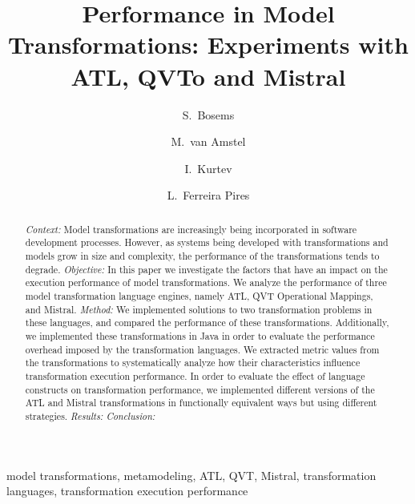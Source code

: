 \documentclass[12pt]{elsarticle}
\begin{document}
\begin{frontmatter}

\title{Performance in Model Transformations: Experiments with ATL, QVTo and
Mistral}

\author[ut]{S.~Bosems}

\author[tue]{M.~van Amstel}
\author[ut]{I.~Kurtev}
\author[ut]{L.~Ferreira Pires}


\address[ut]{Faculty of Electrical Engineering, Mathematics and Computer
Science, University of Twente, Drienerlolaan 5, 7522NB, Enschede, The
Netherlands}
\address[tue]{Department of Mathematics and Computer Science, Eindhoven
University of Technology, Den Dolesch 2, 5612AZ, Eindhoven, The Netherlands}

\begin{abstract}
 

\emph{Context: } Model transformations are increasingly being incorporated in
software development processes. However, as systems being developed with
transformations and models grow in size and complexity, the performance of the
transformations tends to degrade.
\emph{Objective: } In this paper we investigate the factors that have an impact on the
execution performance of model transformations. We analyze the performance of
three model transformation language engines, namely ATL, QVT Operational
Mappings, and Mistral. 
\emph{Method: } We implemented solutions to two transformation problems
in these languages, and compared the performance of these transformations.
Additionally, we implemented these transformations in Java in order to
evaluate the performance overhead imposed by the transformation languages. We
extracted metric values from the transformations to systematically analyze how
their characteristics influence transformation execution performance. In order
to evaluate the effect of language constructs on transformation performance, we
implemented different versions of the ATL and Mistral transformations in
functionally equivalent ways but using different strategies.
\emph{Results: } 
\emph{Conclusion: }


\end{abstract}

\begin{keyword}model transformations, metamodeling, ATL, QVT, Mistral,
transformation languages, transformation execution performance\end{keyword}
\end{frontmatter}
\end{document}

